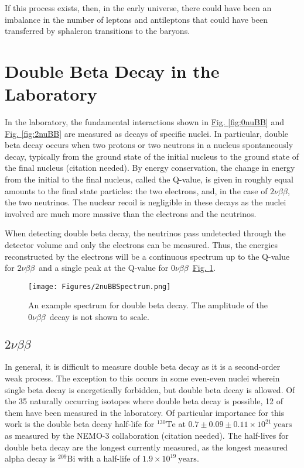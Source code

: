 \documentclass[12pt,a4paper]{article}
\newcommand{\zeronubb}{$0\nu \beta \beta$}
\newcommand{\twonubb}{$2\nu \beta \beta$}
\begin{document}
If this process exists, then, in the early universe, there could have been an imbalance in the number of leptons and antileptons that could have been transferred by sphaleron transitions to the baryons.


\section{Double Beta Decay in the Laboratory}

In the laboratory, the fundamental interactions shown in \hyperref[fig:0nuBB]{Fig. \ref*{fig:0nuBB}} and \hyperref[fig:2nuBB]{Fig. \ref*{fig:2nuBB}} are measured as decays of specific nuclei. In particular, double beta decay occurs when two protons or two neutrons in a nucleus spontaneously decay, typically from the ground state of the initial nucleus to the ground state of the final nucleus (\color{blue}citation needed\color{black}). By energy conservation, the change in energy from the initial to the final nucleus, called the Q-value, is given in roughly equal amounts to the final state particles: the two electrons, and, in the case of \twonubb, the two neutrinos. The nuclear recoil is negligible in these decays as the nuclei involved are much more massive than the electrons and the neutrinos. 

When detecting double beta decay, the neutrinos pass undetected through the detector volume and only the electrons can be measured. Thus, the energies reconstructed by the electrons will be a continuous spectrum up to the Q-value for \twonubb~and a single peak at the Q-value for \zeronubb~\hyperref[fig:2nubbspectrum]{Fig. \ref*{fig:2nubbspectrum}}.

\begin{figure} [h]
\centering
\texttt{[image: Figures/2nuBBSpectrum.png]}
\caption{An example spectrum for double beta decay. The amplitude of the \zeronubb~decay is not shown to scale.}
\label{fig:2nubbspectrum}
\end{figure}


\subsection{\twonubb}
In general, it is difficult to measure double beta decay as it is a second-order weak process. The exception to this occurs in some even-even nuclei wherein single beta decay is energetically forbidden, but double beta decay is allowed. Of the 35 naturally occurring isotopes where double beta decay is possible, 12 of them have been measured in the laboratory. Of particular importance for this work is the double beta decay half-life for $^{130}\textrm{Te}$ at $0.7 \pm 0.09 \pm 0.11 \times 10^{21}~\textrm{years}$ as measured by the NEMO-3 collaboration (\color{blue}citation needed\color{black}). The half-lives for double beta decay are the longest currently measured, as the longest measured alpha decay is $^{209}\textrm{Bi}$ with a half-life of $1.9 \times 10^{19}~\textrm{years}$.
\end{document}
